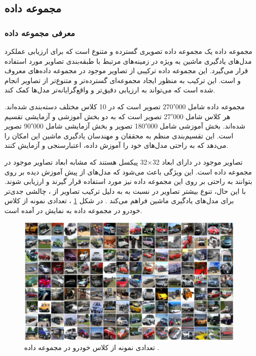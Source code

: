 \subsection{
	مجموعه داده
}


\vspace{3mm}
\subsubsection{
	معرفی مجموعه داده
}\vspace{-1mm}


مجموعه داده
یک مجموعه داده تصویری گسترده و متنوع است که برای ارزیابی عملکرد مدل‌های یادگیری ماشین به ویژه در زمینه‌های مرتبط با طبقه‌بندی تصاویر مورد استفاده قرار می‌گیرد. این مجموعه داده ترکیبی از تصاویر موجود در مجموعه‌ داده‌های معروف
و
است. این ترکیب به منظور ایجاد مجموعه‌ای گسترده‌تر و متنوع‌تر از تصاویر انجام شده است که می‌تواند به ارزیابی دقیق‌تر و واقع‌گرایانه‌تر مدل‌ها کمک کند.

مجموعه داده
شامل 270٬000 تصویر است که در 10 کلاس مختلف دسته‌بندی شده‌اند. هر کلاس شامل 27٬000 تصویر است که به دو بخش آموزشی و آزمایشی تقسیم شده‌اند. بخش آموزشی شامل 180٬000 تصویر و بخش آزمایشی شامل 90٬000 تصویر است. این تقسیم‌بندی منظم به محققان و مهندسان یادگیری ماشین این امکان را می‌دهد که به راحتی مدل‌های خود را آموزش داده، اعتبارسنجی و آزمایش کنند.

تصاویر موجود در
دارای ابعاد
32$\times$32
پیکسل هستند که مشابه ابعاد تصاویر موجود در مجموعه داده
است. این ویژگی باعث می‌شود که مدل‌های از پیش آموزش دیده بر روی
بتوانند به راحتی بر روی این مجموعه داده نیز مورد استفاده قرار گیرند و ارزیابی شوند. با این حال، تنوع بیشتر تصاویر در
نسبت به
به دلیل ترکیب تصاویر از
،
چالشی جدی‌تر برای مدل‌های یادگیری ماشین فراهم می‌کند
\cite{darlow2018cinic}.
در شکل
\ref{cinic10}%
، تعدادی نمونه از کلاس خودرو در مجموعه داده
\mbox{}
به نمایش در آمده است.


\begin{figure}[b!]
	\centering
	\includegraphics[scale=0.5]{images/chap5/cinic10.png}%
	\caption{%
		تعدادی نمونه از کلاس خودرو در مجموعه داده
		\cite{darlow2018cinic}.
	}
	\label{cinic10}
	\centering
\end{figure}



